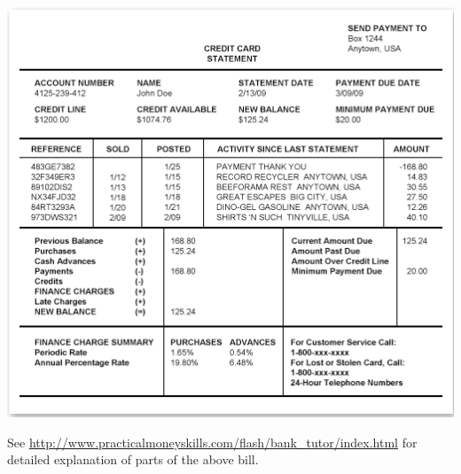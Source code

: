 \documentclass[notheorems
          ]
          {beamer}
\begin{document}
\begin{frame}
 \begin{center}
    
  \includegraphics[height=0.8\textheight ]{img/credit_card.png}
 \end{center}

 
 \footnotesize{
 See \url{http://www.practicalmoneyskills.com/flash/bank_tutor/index.html} for 
 detailed explanation of parts of the above bill. 
}
\end{frame}
\end{document}
